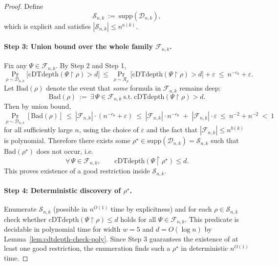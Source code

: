 \documentclass[12pt]{article}
\theoremstyle{definition}
\theoremstyle{definition}
\theoremstyle{remark}
\theoremstyle{remark}
\begin{document}
\begin{proof}
Define
\[
\mathcal{S}_{n,k}\ :=\ \mathrm{supp}(\mathcal{D}_{n,k}),
\]
which is explicit and satisfies $|\mathcal{S}_{n,k}|\le n^{a(k)}$.

\paragraph{Step 3: Union bound over the whole family $\mathcal{F}_{n,k}$.}
Fix any $\Psi\in\mathcal{F}_{n,k}$. By Step 2 and Step 1,
\[
\Pr_{\rho\sim\mathcal{D}_{n,k}}\!\big[\mathrm{cDTdepth}(\Psi\!\upharpoonright\!\rho) > d\big]
\ \le\
\Pr_{\rho\sim\mathcal{R}_p}\!\big[\mathrm{cDTdepth}(\Psi\!\upharpoonright\!\rho) > d\big] + \varepsilon
\ \le\ n^{-c_0} + \varepsilon.
\]
Let $\mathrm{Bad}(\rho)$ denote the event that \emph{some} formula in $\mathcal{F}_{n,k}$
remains deep:
\[
\mathrm{Bad}(\rho)\ :=\ \exists\,\Psi\in\mathcal{F}_{n,k}\ \text{s.t.}\
\mathrm{cDTdepth}(\Psi\!\upharpoonright\!\rho)>d.
\]
Then by union bound,
\[
\Pr_{\rho\sim\mathcal{D}_{n,k}}[\mathrm{Bad}(\rho)]
\ \le\ |\mathcal{F}_{n,k}|\cdot(n^{-c_0}+\varepsilon)
\ \le\ |\mathcal{F}_{n,k}|\cdot n^{-c_0} \;+\; |\mathcal{F}_{n,k}|\cdot \varepsilon
\ \le\ n^{-2} + n^{-2}
\ <\ 1
\]
for all sufficiently large $n$, using the choice of $\varepsilon$ and the fact that
$|\mathcal{F}_{n,k}|\le n^{b(k)}$ is polynomial. Therefore there exists some
$\rho^\star\in\mathrm{supp}(\mathcal{D}_{n,k})=\mathcal{S}_{n,k}$ such that $\mathrm{Bad}(\rho^\star)$
does not occur, i.e.
\[
\forall\,\Psi\in\mathcal{F}_{n,k},\qquad \mathrm{cDTdepth}(\Psi\!\upharpoonright\!\rho^\star)\le d.
\]
This proves existence of a good restriction inside $\mathcal{S}_{n,k}$.

\paragraph{Step 4: Deterministic discovery of $\rho^\star$.}
Enumerate $\mathcal{S}_{n,k}$ (possible in $n^{O(1)}$ time by explicitness) and for each
$\rho\in\mathcal{S}_{n,k}$ check whether
$\mathrm{cDTdepth}(\Psi\!\upharpoonright\!\rho)\le d$ holds for all $\Psi\in\mathcal{F}_{n,k}$.
This predicate is decidable in polynomial time for width $w=5$ and $d=O(\log n)$ by
Lemma~\ref{lem:cdtdepth-check-poly}. Since Step 3 guarantees the existence of at least one
good restriction, the enumeration finds such a $\rho^\star$ in deterministic $n^{O(1)}$ time.
\end{proof}

\end{document}
